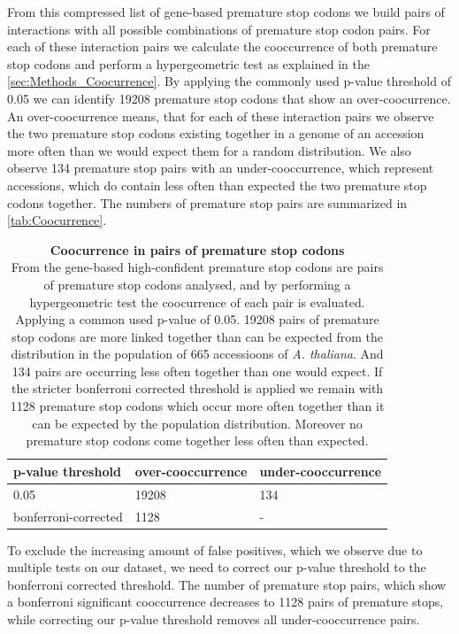 From this compressed list of gene-based premature stop codons we build pairs of interactions with all possible combinations of premature stop codon pairs. For each of these interaction pairs we calculate the cooccurrence of both premature stop codons and perform a hypergeometric test as explained in the \autoref{sec:Methods_Coocurrence}. By applying the commonly used p-value threshold of 0.05 we can identify 19208 premature stop codons that show an over-coocurrence. 
An over-coocurrence means, that for each of these interaction pairs we observe the two premature stop codons existing together in a genome of an accession more often than we would expect them for a random distribution. We also observe 134 premature stop pairs with an under-cooccurrence, which represent accessions, which do contain less often than expected the two premature stop codons together. The numbers of premature stop pairs are summarized in \autoref{tab:Coocurrence}. 
\begin{table}[tb]
  \caption[Coocurrence in pairs of premature stop codons]{\textbf{Coocurrence in pairs of premature stop codons}\\
  From the gene-based high-confident premature stop codons are pairs of premature stop codons analysed, and by performing a hypergeometric test the coocurrence of each pair is evaluated. Applying a common used p-value of 0.05. 19208 pairs of premature stop codons are more linked together than can be expected from the distribution in the population of 665 accessioons of \textit{A. thaliana}. And 134 pairs are occurring less often together than one would expect. If the stricter bonferroni corrected threshold is applied we remain with 1128 premature stop codons which occur more often together than it can be expected by the population distribution. Moreover no premature stop codons come together less often than expected. }
  \label{tab:Coocurrence}
  \centering
  \begin{tabular}{|l|l|l|}
  \hline
  \textbf{p-value threshold} & \textbf{over-cooccurrence}  &  \textbf{under-cooccurrence}  \\ \hline
  0.05 & 19208 &  134 \\ \hline
  bonferroni-corrected & 1128 &  - \\ \hline
  \end{tabular}
  \end{table}

To exclude the increasing amount of false positives, which we observe due to multiple tests on our dataset, we need to correct our p-value threshold to the bonferroni corrected threshold. The number of premature stop pairs, which show a bonferroni significant cooccurrence decreases to 1128 pairs of premature stops, while correcting our p-value threshold removes all under-cooccurrence pairs. 

